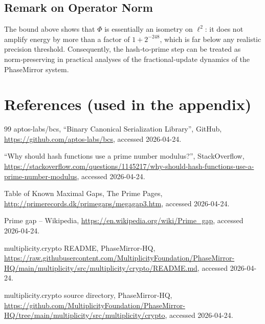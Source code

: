 \documentclass[11pt]{article}
\begin{document}
\subsection{Remark on Operator Norm}
The bound above shows that $\Phi$ is essentially an isometry on $\ell^{2}$:
it does not amplify energy by more than a factor of $1+2^{-248}$, which is
far below any realistic precision threshold.  Consequently, the hash‑to‑prime
step can be treated as norm‑preserving in practical analyses of the
fractional‑update dynamics of the PhaseMirror system.

\section*{References (used in the appendix)}
\begin{thebibliography}{99}
    aptos-labs/bcs, ``Binary Canonical Serialization Library'', GitHub,
    \url{https://github.com/aptos-labs/bcs}, accessed 2026-04-24.

    ``Why should hash functions use a prime number modulus?'',
    StackOverflow, \url{https://stackoverflow.com/questions/1145217/why-should-hash-functions-use-a-prime-number-modulus},
    accessed 2026-04-24.

    Table of Known Maximal Gaps, The Prime Pages,
    \url{http://primerecords.dk/primegaps/megagap3.htm}, accessed 2026-04-24.

    Prime gap – Wikipedia,
    \url{https://en.wikipedia.org/wiki/Prime_gap}, accessed 2026-04-24.

    multiplicity.crypto README, PhaseMirror‑HQ,
    \url{https://raw.githubusercontent.com/MultiplicityFoundation/PhaseMirror-HQ/main/multiplicity/src/multiplicity/crypto/README.md},
    accessed 2026-04-24.

    multiplicity.crypto source directory, PhaseMirror‑HQ,
    \url{https://github.com/MultiplicityFoundation/PhaseMirror-HQ/tree/main/multiplicity/src/multiplicity/crypto},
    accessed 2026-04-24.
\end{thebibliography}


\nocite{*}
  

\end{document}
